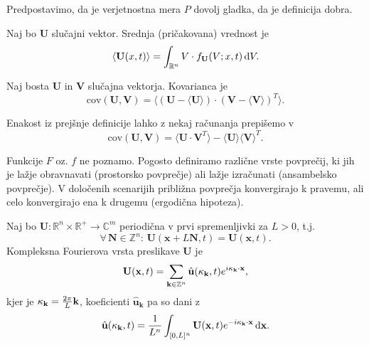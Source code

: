 \documentclass[mat2, tisk]{fmfdelo}
\newcommand{\R}{\mathbb R}
\newcommand{\Z}{\mathbb Z}
\newcommand{\bd}{\textbf}
\newcommand{\C}{\mathbb C}
\begin{document}
\begin{opomba}
Predpostavimo, da je verjetnostna mera $P$ dovolj gladka, da je definicija dobra.
\end{opomba}

\begin{definicija}
Naj bo $\bd{U}$ slučajni vektor. Srednja (pričakovana) vrednost je 
\begin{equation*}
\langle \bd{U}(x, t) \rangle = \int_{\R^n} V \cdot f_{\bd{U}}(V; x, t) \dif V.
\end{equation*}
\end{definicija}

\begin{definicija}
Naj bosta $\bd{U}$ in $\bd{V}$ slučajna vektorja. Kovarianca je 
\begin{equation*}
\text{cov}(\bd{U}, \bd{V}) = \langle (\bd{U} - \langle \bd{U} \rangle)\cdot (\bd{V} - \langle \bd{V} \rangle)^T \rangle.
\end{equation*}
\end{definicija}

\begin{opomba}
Enakost iz prejšnje definicije lahko z nekaj računanja prepišemo v 
\begin{equation*}
\text{cov}(\bd{U}, \bd{V}) = \langle \bd{U}\cdot \bd{V}^T \rangle - \langle \bd{U} \rangle  \langle \bd{V} \rangle^T.
\end{equation*}
\end{opomba}

\noindent
Funkcije $F$ oz. $f$ ne poznamo. Pogosto definiramo različne vrste povprečij, 
ki jih je lažje obravnavati (prostorsko povprečje) ali lažje izračunati (ansambelsko povprečje).
V določenih scenarijih približna povprečja konvergirajo k pravemu, 
ali celo konvergirajo ena k drugemu (ergodična hipoteza). 

\begin{definicija}
Naj bo $\bd{U}: \R^n \times \R^+ \rightarrow \C^m$ periodična v prvi spremenljivki za $L>0$, t.j. 
$$
\forall \,\bd{N}\in \Z^n: \,\bd{U}(\bd{x} + L\bd{N}, t) = \bd{U}(\bd{x}, t).
$$
Kompleksna Fourierova vrsta preslikave $\bd{U}$ je 
\begin{equation*}
\bd{U}(\bd{x}, t) = \sum_{\bd{k}\in \Z^{n}} \hat{\bd{u}}(\bd{\text{$\kappa$}}_\bd{k}, t) e^{i\bd{\text{$\kappa$}}_\bd{k} \cdot \bd{x}},
\end{equation*}
kjer je $\bd{\text{$\kappa$}}_\bd{k} = \frac{2\pi}{L} \bd{k}$, koeficienti $\hat{\bd{u}}_\bd{k}$ pa so dani z 
\begin{equation*}
\hat{\bd{u}}(\bd{\text{$\kappa$}}_\bd{k}, t) = \frac{1}{L^n} \int_{[0, L]^n} \bd{U}(\bd{x}, t) e^{-i\bd{\text{$\kappa$}}_\bd{k} \cdot \bd{x}} \dif \bd{x}.
\end{equation*}
\end{definicija}
\end{document}
